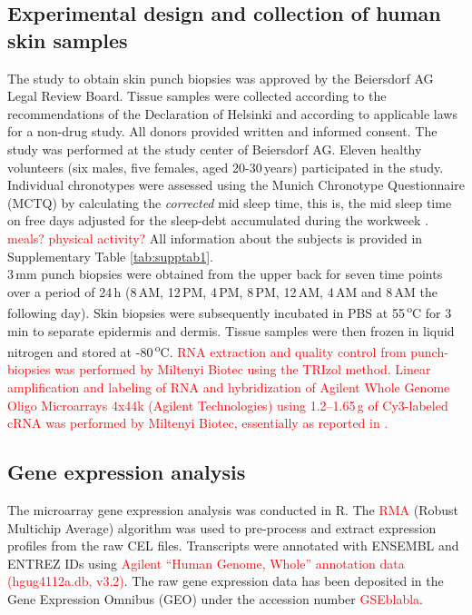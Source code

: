 \subsection*{Experimental design and collection of human skin samples}
The study to obtain skin punch biopsies was approved by the Beiersdorf AG Legal Review Board. Tissue samples were collected according to the recommendations of the Declaration of Helsinki and according to applicable laws for a non-drug study. All donors provided written and informed consent. The study was performed at the study center of Beiersdorf AG. Eleven healthy volunteers (six males, five females, aged 20-30\,years) participated in the study. Individual chronotypes were assessed using the Munich Chronotype Questionnaire (MCTQ) by calculating the \textit{corrected} mid sleep time, this is, the mid sleep time on free days adjusted for the sleep-debt accumulated during the workweek \cite{Vetter2021}. \textcolor{red}{meals? physical activity?} All information about the subjects is provided in Supplementary Table \ref{tab:supptab1}. \\ %

3\,mm punch biopsies were obtained from the upper back for seven time points over a period of 24\,h (8\,AM, 12\,PM, 4\,PM, 8\,PM, 12\,AM, 4\,AM and 8\,AM the following day). Skin biopsies were subsequently incubated in PBS at 55\,\textsuperscript{o}C for 3\,min to separate epidermis and dermis. Tissue samples were then frozen in liquid nitrogen and stored at -80\,\textsuperscript{o}C. \textcolor{red}{RNA extraction and quality control from punch-biopsies was performed by Miltenyi Biotec using the TRIzol method. Linear amplification and labeling of RNA and hybridization of Agilent Whole Genome Oligo Microarrays 4x44k (Agilent Technologies) using 1.2--1.65\,\textmu g of Cy3-labeled cRNA was performed by Miltenyi Biotec, essentially as reported in \cite{Duggan1999}.} 

\subsection*{Gene expression analysis}
The microarray gene expression analysis was conducted in R. The \textcolor{red}{RMA} (Robust Multichip Average) algorithm was used to pre-process and extract expression profiles from the raw CEL files. Transcripts were annotated with ENSEMBL and ENTREZ IDs using \textcolor{red}{Agilent ``Human Genome, Whole'' annotation data (hgug4112a.db, v3.2)}. The raw gene expression data has been deposited in the Gene Expression Omnibus (GEO) under the accession number \textcolor{red}{GSEblabla}. \\

